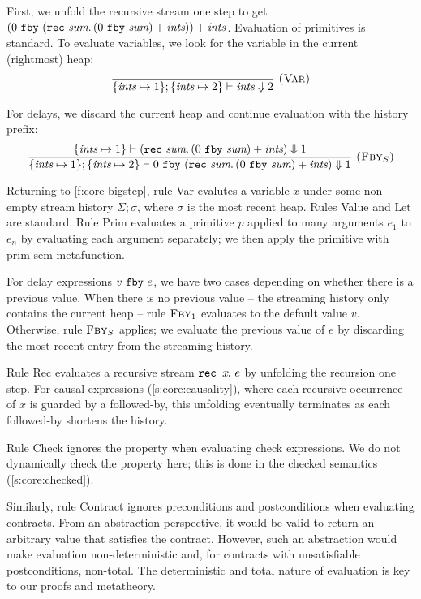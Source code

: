 First, we unfold the recursive stream one step to get $(0~\texttt{fby}~(\texttt{rec}~\textit{sum}.\, (0~\texttt{fby}~\textit{sum}) + \textit{ints})) + \textit{ints}$.
Evaluation of primitives is standard.
To evaluate variables, we look for the variable in the current (rightmost) heap:
$$
\enskip \frac {\displaystyle 
} {\displaystyle 
  \{ \textit{ints} \mapsto 1 \}; \{ \textit{ints} \mapsto 2 \} \vdash \textit{ints} \Downarrow 2
} \  \textsc{(Var)} \enskip
$$

For delays, we discard the current heap and continue evaluation with the history prefix:
$$
\enskip \frac {\displaystyle 
  \{ \textit{ints} \mapsto 1 \} \vdash (\texttt{rec}~\textit{sum}.\, (0~\texttt{fby}~\textit{sum}) + \textit{ints}) \Downarrow 1
} {\displaystyle 
  \{ \textit{ints} \mapsto 1 \}; \{ \textit{ints} \mapsto 2 \} \vdash 0~\texttt{fby}~(\texttt{rec}~\textit{sum}.\, (0~\texttt{fby}~\textit{sum}) + \textit{ints}) \Downarrow 1
} \  \textsc{($\mbox{Fby}_S$)} \enskip
$$

Returning to \autoref{f:core-bigstep},
rule {\sc Var} evalutes a variable $x$ under some non-empty stream history $\Sigma; \sigma$, where $\sigma$ is the most recent heap.
Rules {\sc Value} and {\sc Let} are standard.
Rule {\sc Prim} evaluates a primitive $p$ applied to many arguments $e_1$ to $e_n$ by evaluating each argument separately; we then apply the primitive with prim-sem metafunction.

For delay expressions $v~\texttt{fby}~e$, we have two cases depending on whether there is a previous value.
When there is no previous value -- the streaming history only contains the current heap -- rule $\textsc{Fby}_1$ evaluates to the default value $v$.
Otherwise, rule $\textsc{Fby}_S$ applies; we evaluate the previous value of $e$ by discarding the most recent entry from the streaming history.

Rule {\sc Rec} evaluates a recursive stream $\texttt{rec~} x\hspace{-0.1em}.~e$ by unfolding the recursion one step.
For causal expressions (\autoref{s:core:causality}), where each recursive occurrence of $x$ is guarded by a followed-by, this unfolding eventually terminates as each followed-by shortens the history.

Rule {\sc Check} ignores the property when evaluating check expressions.
We do not dynamically check the property here; this is done in the checked semantics (\autoref{s:core:checked}).

Similarly, rule {\sc Contract} ignores preconditions and postconditions when evaluating contracts.
From an abstraction perspective, it would be valid to return an arbitrary value that satisfies the contract.
However, such an abstraction would make evaluation non-deterministic and, for contracts with unsatisfiable postconditions, non-total.
The deterministic and total nature of evaluation is key to our proofs and metatheory.

